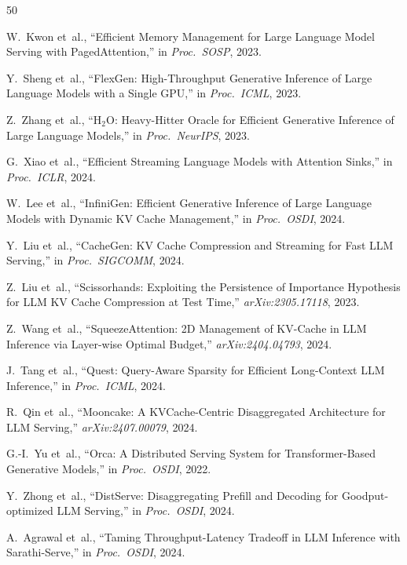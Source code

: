 \documentclass[conference]{IEEEtran}
\begin{document}
\balance

\begin{thebibliography}{50}

 W.~Kwon et~al., ``Efficient Memory Management for Large Language Model Serving with PagedAttention,'' in \textit{Proc.\ SOSP}, 2023.

 Y.~Sheng et~al., ``FlexGen: High-Throughput Generative Inference of Large Language Models with a Single GPU,'' in \textit{Proc.\ ICML}, 2023.

 Z.~Zhang et~al., ``H$_2$O: Heavy-Hitter Oracle for Efficient Generative Inference of Large Language Models,'' in \textit{Proc.\ NeurIPS}, 2023.

 G.~Xiao et~al., ``Efficient Streaming Language Models with Attention Sinks,'' in \textit{Proc.\ ICLR}, 2024.

 W.~Lee et~al., ``InfiniGen: Efficient Generative Inference of Large Language Models with Dynamic KV Cache Management,'' in \textit{Proc.\ OSDI}, 2024.

 Y.~Liu et~al., ``CacheGen: KV Cache Compression and Streaming for Fast LLM Serving,'' in \textit{Proc.\ SIGCOMM}, 2024.

 Z.~Liu et~al., ``Scissorhands: Exploiting the Persistence of Importance Hypothesis for LLM KV Cache Compression at Test Time,'' \textit{arXiv:2305.17118}, 2023.

 Z.~Wang et~al., ``SqueezeAttention: 2D Management of KV-Cache in LLM Inference via Layer-wise Optimal Budget,'' \textit{arXiv:2404.04793}, 2024.

 J.~Tang et~al., ``Quest: Query-Aware Sparsity for Efficient Long-Context LLM Inference,'' in \textit{Proc.\ ICML}, 2024.

 R.~Qin et~al., ``Mooncake: A KVCache-Centric Disaggregated Architecture for LLM Serving,'' \textit{arXiv:2407.00079}, 2024.

 G.-I.~Yu et~al., ``Orca: A Distributed Serving System for Transformer-Based Generative Models,'' in \textit{Proc.\ OSDI}, 2022.

 Y.~Zhong et~al., ``DistServe: Disaggregating Prefill and Decoding for Goodput-optimized LLM Serving,'' in \textit{Proc.\ OSDI}, 2024.

 A.~Agrawal et~al., ``Taming Throughput-Latency Tradeoff in LLM Inference with Sarathi-Serve,'' in \textit{Proc.\ OSDI}, 2024.


\end{thebibliography}
\end{document}
